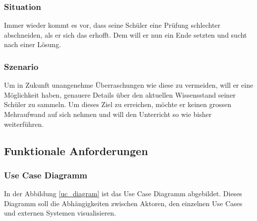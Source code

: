 \subsubsection*{Situation}
Immer wieder kommt es vor, dass seine Schüler eine Prüfung schlechter abschneiden, als er sich das erhofft. Dem will er nun ein Ende setzten und sucht nach einer Lösung.

\subsubsection*{Szenario}
Um in Zukunft unangenehme Überraschungen wie diese zu vermeiden, will er eine Möglichkeit haben, genauere Details über den aktuellen Wissensstand seiner Schüler zu sammeln. Um dieses Ziel zu erreichen, möchte er keinen grossen Mehraufwand auf sich nehmen und will den Unterricht so wie bisher weiterführen.


\subsection{Funktionale Anforderungen}

\subsubsection{Use Case Diagramm}
In der Abbildung \ref{uc_diagram} ist das Use Case Diagramm abgebildet. Dieses Diagramm soll die Abhängigkeiten zwischen Aktoren, den einzelnen Use Cases und externen Systemen visualisieren.

